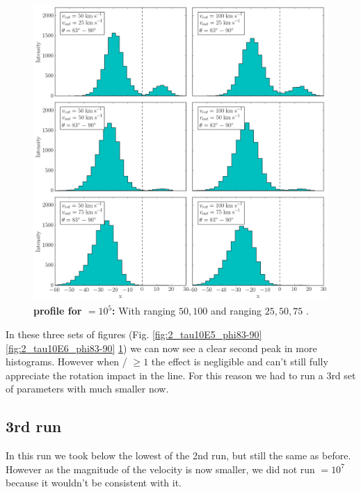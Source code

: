 \begin{figure}[h!]
	\begin{center}
		\includegraphics[width=1\textwidth]{./figures/chapter3/2_tau10E7_phi83-90}
	\end{center}
	\caption{\textbf{\lya profile for \tauh$=10^5$:} With \vrot ranging $50,100$ \kms and \vout ranging $25,50,75$ \kms.
		\label{fig:2_tau10E7_phi83-90}}
\end{figure}

In these three sets of figures (Fig. \ref{fig:2_tau10E5_phi83-90} \ref{fig:2_tau10E6_phi83-90} \ref{fig:2_tau10E7_phi83-90}) we can now see a clear second peak in more histograms. However when \vout/ \vrot $\geq 1$ the effect is negligible and can't still fully appreciate the rotation impact in the line. For this reason we had to run a 3rd set of parameters with \vout much smaller now. \\

\newpage

\subsection{3rd run}

In this run we took \vout below the lowest \vout of the 2nd run, but still the same \vrot as before. However as the magnitude of the velocity is now smaller, we did not run \tauh $=10^7$ because it wouldn't be consistent with it. \\

